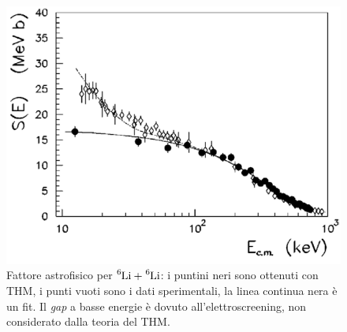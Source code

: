 \begin{enumerate}
	\vspace{-1cm}
	\begin{figure}[!h]
		\centering
		\includegraphics[scale=0.5]{Immagini/0421_Se.png}
		\caption{Fattore astrofisico per $\ce{^6Li} + \ce{^6Li}$: i puntini neri sono ottenuti con THM, i punti vuoti sono i dati sperimentali, la linea continua nera è un fit. Il \textit{gap} a basse energie è dovuto all'elettroscreening, non considerato dalla teoria del THM.}
		\label{0421_Se}
	\end{figure}	
\end{enumerate}
